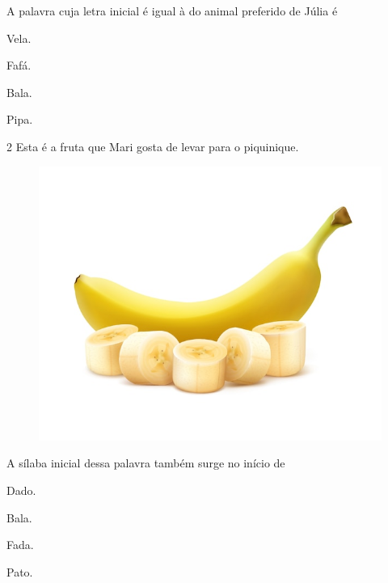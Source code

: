 
A palavra cuja letra inicial é igual à do animal preferido de Júlia é

\begin{multicols}{2}
\begin{escolha}
\item Vela.

\item Fafá.

\item Bala.

\item Pipa.
\end{escolha}
\end{multicols}

\num{2} Esta é a fruta que Mari gosta de levar para o piquinique.

\begin{figure}[htpb!]
\centering
\includegraphics[width=.5\textwidth]{media/image175.jpeg}
\end{figure}


A sílaba inicial dessa palavra também surge no início de

\begin{multicols}{2}
\begin{escolha}
\item Dado.

\item Bala.

\item Fada.

\item Pato.
\end{escolha}
\end{multicols}


